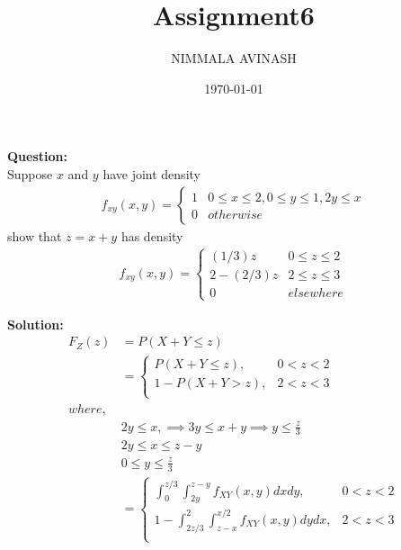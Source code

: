 \documentclass{beamer}
\title{Assignment6}
\author{NIMMALA AVINASH}
\institute{IITH}
\date{\today}
\begin{document}
\frame{\titlepage}
\begin{frame}
{\LARGE \textbf{Question:\\}}
Suppose $ x $ and $ y $ have joint density
\begin{align}
f_{xy}(x,y)=\begin{cases}
1 &0\leq x\leq 2,0\leq y\leq 1,2y \leq x\\
0 &otherwise
\end{cases}
\end{align}
show that $ z = x+y $ has density
\begin{align}
f_{xy}(x,y) = \begin{cases}
(1/3)z &0\leq z\leq 2\\
2-(2/3)z &2\leq z\leq 3\\
0 &elsewhere
\end{cases}
\end{align}
\end{frame}
\begin{frame}
{\LARGE \textbf{Solution:}}
\begin{align}
F_{Z}(z) &= P(X+Y \leq z)\\
&=\begin{cases}
P(X+Y\leq z), &0 < z < 2\\
1-P(X+Y>z), &2 < z < 3\\
\end{cases}\\
where,\\
 &2y\leq x ,\implies3y\leq x+y \implies y \leq \frac{z}{3}\\
 & 2y \leq x \leq z-y\\
 & 0 \leq y \leq \frac{z}{3}\\
&=\begin{cases}
\int_{0}^{z/3} \int_{2y}^{z-y}f_{XY}(x,y) dx dy  , &0 < z < 2\\
1-\int_{2z/3}^{2} \int_{z-x}^{x/2}f_{XY}(x,y) dy dx , &2 < z < 3\\
\end{cases}\\
\end{align}
\end{frame}
\end{document}
